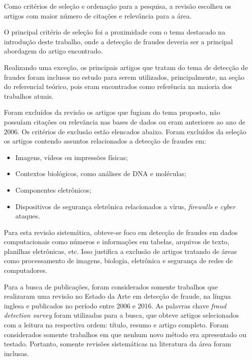 \documentclass[smallextended]{svjour3}
\begin{document}
Como critérios de seleção e ordenação para a pesquisa, a revisão escolheu os artigos com maior número de citações e relevância para a área. 

O principal critério de seleção foi a proximidade com o tema destacado na introdução deste trabalho, onde a detecção de fraudes deveria ser a principal abordagem do artigo encontrado.

Realizando uma exceção, os principais artigos que tratam do tema de detecção de fraudes foram inclusos no estudo para serem utilizados, principalmente, na seção do referencial teórico, pois eram encontrados como referência na maioria dos trabalhos atuais.

Foram excluídos da revisão os artigos que fugiam do tema proposto, não possuíam citações ou relevância nas bases de dados ou eram anteriores ao ano de 2006. Os critérios de exclusão estão elencados abaixo. Foram excluídos da seleção os artigos contendo assuntos relacionados a detecção de fraudes em:

\begin{itemize}
	\item Imagens, vídeos ou impressões físicas;
	
	\item Contextos biológicos, como análises de DNA e moléculas;
	
	\item Componentes eletrônicos; 	
	
	\item Dispositivos de segurança eletrônica relacionados a vírus, \emph{firewalls} e \emph{cyber} ataques.
\end{itemize}

Para esta revisão sistemática, obteve-se foco em detecção de fraudes em dados computacionais como números e informações em tabelas, arquivos de texto, planilhas eletrônicas, etc. Isso justifica a exclusão de artigos tratando de áreas como processamento de imagens, biologia, eletrônica e segurança de redes de computadores.

Para a busca de publicações, foram considerados somente trabalhos que realizaram uma revisão no Estado da Arte em detecção de fraude, na língua inglesa e publicados no período entre 2006 e 2016. As palavras chave \emph{fraud detection survey} foram utilizadas para a busca, que obteve artigos selecionados com a leitura na respectiva ordem: título, resumo e artigo completo. Foram considerados somente trabalhos em que nenhum novo método era apresentado ou testado. Portanto, somente revisões sistemáticas na literatura da área foram inclusas.
\end{document}
